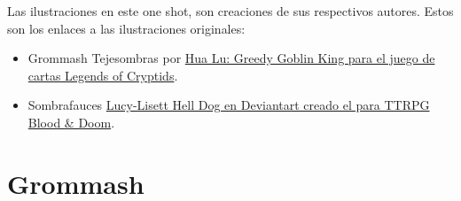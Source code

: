 \documentclass[10pt,twoside,twocolumn,openany]{dndbook}
\begin{document}
Las ilustraciones en este one shot, son creaciones de sus respectivos autores. Estos son los enlaces
a las ilustraciones originales:

\begin{itemize}
  \item Grommash Tejesombras por \href{https://legendofthecryptids.fandom.com/wiki/Greedy_Goblin_King}{Hua Lu: Greedy Goblin King para el juego de cartas Legends of Cryptids}.
  \item Sombrafauces \href{https://www.deviantart.com/lucy-lisett/art/Death-Dog-901248620}{Lucy-Lisett Hell Dog en Deviantart creado el para TTRPG Blood \& Doom}.
\end{itemize}

\chapter*{Grommash}


\end{document}
